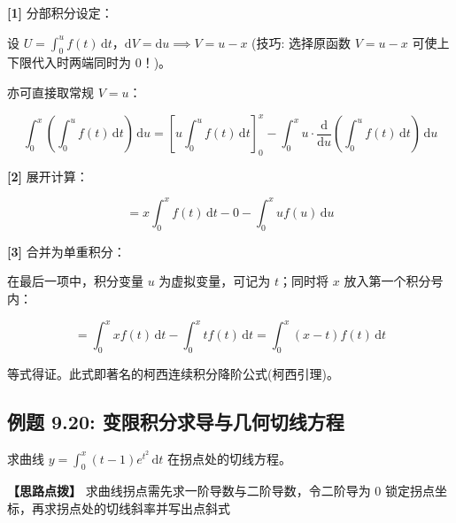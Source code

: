 \documentclass[11pt,a4paper,UTF8]{ctexart}
\begin{document}
\begin{solbox}[分步推导与答题规范]
\textbf{[1]} 分部积分设定：

设 $U = \int_0^u f(t)\,\mathrm{d}t$，$\mathrm{d}V = \mathrm{d}u \implies V = u - x$ (技巧: 选择原函数 $V = u - x$ 可使上下限代入时两端同时为 0！)。

亦可直接取常规 $V = u$：


\begin{equation*}
\int_0^x \left(\int_0^u f(t)\,\mathrm{d}t\right)\,\mathrm{d}u = \left[ u \int_0^u f(t)\,\mathrm{d}t \right]_0^x - \int_0^x u \cdot \frac{\mathrm{d}}{\mathrm{d}u}\left(\int_0^u f(t)\,\mathrm{d}t\right)\,\mathrm{d}u
\end{equation*}


\textbf{[2]} 展开计算：


\begin{equation*}
= x \int_0^x f(t)\,\mathrm{d}t - 0 - \int_0^x u f(u)\,\mathrm{d}u
\end{equation*}


\textbf{[3]} 合并为单重积分：

在最后一项中，积分变量 $u$ 为虚拟变量，可记为 $t$；同时将 $x$ 放入第一个积分号内：


\begin{equation*}
= \int_0^x x f(t)\,\mathrm{d}t - \int_0^x t f(t)\,\mathrm{d}t = \int_0^x (x-t)f(t)\,\mathrm{d}t
\end{equation*}


等式得证。此式即著名的柯西连续积分降阶公式(柯西引理)。
\end{solbox}


\subsection{例题 9.20: 变限积分求导与几何切线方程}

求曲线 $y = \int_0^x (t-1)e^{t^2}\,\mathrm{d}t$ 在拐点处的切线方程。

\textbf{\color{DeepPurple}【思路点拨】} 求曲线拐点需先求一阶导数与二阶导数，令二阶导为 0 锁定拐点坐标，再求拐点处的切线斜率并写出点斜式
\end{document}
